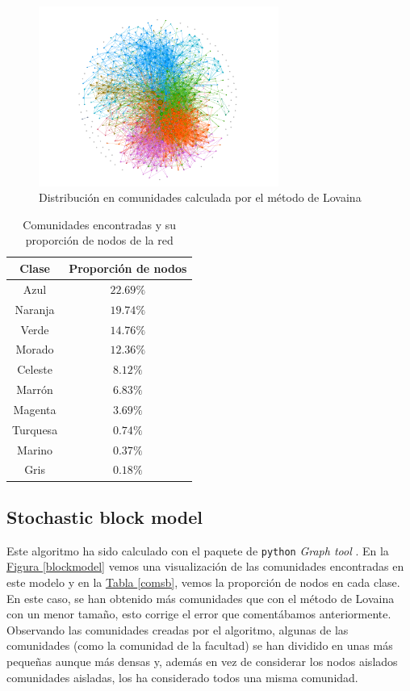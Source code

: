 \documentclass[10pt,a4paper,spanish]{article}
\numberwithin{equation}{section} %
\numberwithin{figure}{section} %
\numberwithin{table}{section} %
\begin{document}
\begin{figure}[!h]
    \centering
    \includegraphics[width=0.7\textwidth]{lovaina}
    \caption{Distribución en comunidades calculada por el método de Lovaina}
    \label{lovaina}
\end{figure}

\begin{table}[!h]
\centering
\begin{tabular}{c | c}
Clase & Proporción de nodos \\
\hline
Azul & $22.69\%$ \\
Naranja & $19.74\%$ \\
Verde & $14.76\%$ \\
Morado & $12.36\%$ \\
Celeste & $8.12\%$ \\
Marrón & $6.83\%$ \\
Magenta & $3.69\%$ \\
Turquesa & $0.74\%$ \\
Marino & $0.37\%$ \\
Gris & $0.18\%$
\end{tabular}
\caption{Comunidades encontradas y su proporción de nodos de la red}
\label{comsl}
\end{table}

\subsection{Stochastic block model}
Este algoritmo ha sido calculado con el paquete de \texttt{python} \textit{Graph tool} \cite{peixoto_graph-tool_2014}. En la \hyperref[blockmodel]{Figura \ref*{blockmodel}} vemos una visualización de las comunidades encontradas en este modelo y en la \hyperref[comsb]{Tabla \ref*{comsb}}, vemos la proporción de nodos en cada clase. En este caso, se han obtenido más comunidades que con el método de Lovaina con un menor tamaño, esto corrige el error que comentábamos anteriormente. Observando las comunidades creadas por el algoritmo, algunas de las comunidades (como la comunidad de la facultad) se han dividido en unas más pequeñas aunque más densas y, además en vez de considerar los nodos aislados comunidades aisladas, los ha considerado todos una misma comunidad.
\end{document}
